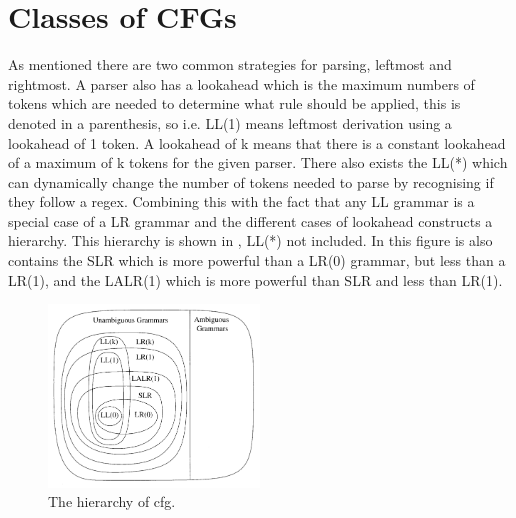\section{Classes of CFGs}
As mentioned there are two common strategies for parsing, leftmost and rightmost. 
A parser also has a lookahead which is the maximum numbers of tokens which are needed to determine what rule should be applied, this is denoted in a parenthesis, so i.e. LL(1) means leftmost derivation using a lookahead of 1 token. 
A lookahead of k means that there is a constant lookahead of a maximum of k tokens for the given parser. 
There also exists the LL(*) which can dynamically change the number of tokens needed to parse by recognising if they follow a \acrshort{regex}.
Combining this with the fact that any LL grammar is a special case of a LR grammar and the different cases of lookahead constructs a hierarchy. 
This hierarchy is shown in , LL(*) not included.
In this figure is also contains the SLR which is more powerful than a LR(0) grammar, but less than a LR(1), and the LALR(1) which is more powerful than SLR and less than LR(1).
\begin{figure}[!ht]
\centering
 \includegraphics[width=0.5\textwidth]{figures/classesofgrammars.png} %
\caption{The hierarchy of \acrlong{cfg}. \citep{NvidiaCUDASeminar} }\label{image:hierarchyofgrammars}
\vspace{-15pt}
\end{figure}

